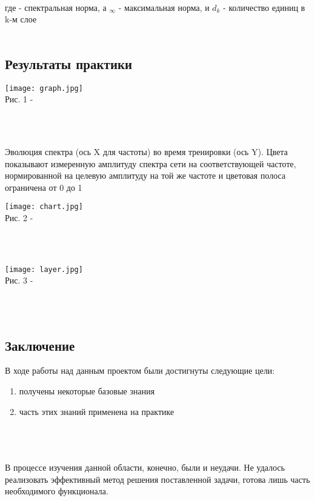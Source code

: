 \documentclass{article}
\begin{document}
    \\
    где \Vert  \Vert - спектральная норма, а \Vert  \Vert$_{\infty}$ - максимальная норма, и $d_k$ - количество единиц в k-м слое
    \\ \\
    \newpage
    \begin{center} 
    \section{Результаты практики}
    \end{center}
    \large
    
    \begin{center} 
    \texttt{[image: graph.jpg]}
    \\
    \caption{Рис. 1 - }
    \\ \\
    \end{center} 
    Эволюция спектра (ось X для частоты) во время тренировки (ось Y). Цвета показывают измеренную амплитуду спектра сети на соответствующей частоте, нормированной на целевую амплитуду на той же частоте и цветовая полоса ограничена от 0 до 1
    \begin{center} 
    \texttt{[image: chart.jpg]}
    \\
    \caption{Рис. 2 - }
    \\ \\
    \end{center} 
    
    \begin{center} 
    \texttt{[image: layer.jpg]}
    \\
    \caption{Рис. 3 - }
    \\ \\
    \end{center} 
    
    \newpage
    \begin{center} 
    \section{Заключение}
    \end{center}
    \large
    В ходе работы над данным проектом были достигнуты следующие цели:\\
    \begin{enumerate}
        \item получены некоторые базовые знания
        \item часть этих знаний применена на практике
    \end{enumerate}
    \\ \\ \\
    В процессе изучения данной области, конечно, были и неудачи. Не удалось реализовать эффективный метод решения поставленной задачи, готова лишь часть необходимого функционала.
    \\ \\
    
\end{document}
